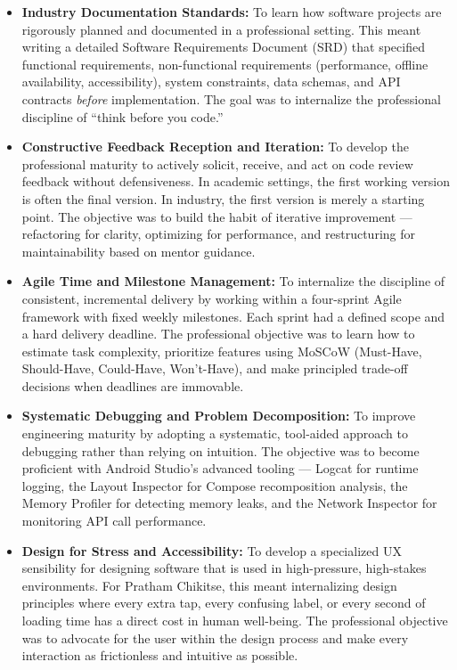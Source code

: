 \documentclass[12pt,a4paper]{report}
\begin{document}
\begin{itemize}
    \item \textbf{Industry Documentation Standards:} To learn how software projects are rigorously planned and documented in a professional setting. This meant writing a detailed Software Requirements Document (SRD) that specified functional requirements, non-functional requirements (performance, offline availability, accessibility), system constraints, data schemas, and API contracts \textit{before} implementation. The goal was to internalize the professional discipline of ``think before you code.''

    \item \textbf{Constructive Feedback Reception and Iteration:} To develop the professional maturity to actively solicit, receive, and act on code review feedback without defensiveness. In academic settings, the first working version is often the final version. In industry, the first version is merely a starting point. The objective was to build the habit of iterative improvement — refactoring for clarity, optimizing for performance, and restructuring for maintainability based on mentor guidance.

    \item \textbf{Agile Time and Milestone Management:} To internalize the discipline of consistent, incremental delivery by working within a four-sprint Agile framework with fixed weekly milestones. Each sprint had a defined scope and a hard delivery deadline. The professional objective was to learn how to estimate task complexity, prioritize features using MoSCoW (Must-Have, Should-Have, Could-Have, Won't-Have), and make principled trade-off decisions when deadlines are immovable.

    \item \textbf{Systematic Debugging and Problem Decomposition:} To improve engineering maturity by adopting a systematic, tool-aided approach to debugging rather than relying on intuition. The objective was to become proficient with Android Studio's advanced tooling — Logcat for runtime logging, the Layout Inspector for Compose recomposition analysis, the Memory Profiler for detecting memory leaks, and the Network Inspector for monitoring API call performance.

    \item \textbf{Design for Stress and Accessibility:} To develop a specialized UX sensibility for designing software that is used in high-pressure, high-stakes environments. For Pratham Chikitse, this meant internalizing design principles where every extra tap, every confusing label, or every second of loading time has a direct cost in human well-being. The professional objective was to advocate for the user within the design process and make every interaction as frictionless and intuitive as possible.
\end{itemize}
\end{document}

